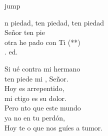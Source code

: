 \begin{cancion}jump\\
	\begin{chorus}%
		n piedad, ten piedad, ten piedad\\
		Señor ten pie\\
		otra  he pado con Ti (**)\\
		. ed.\jump\\
	\end{chorus}%
	Si ué contra mi hermano \\
	ten piede mi , Señor.\\
	Hoy es arrepentido, \\
	mi ctigo es su dolor.\\
	Pero nto que este mundo \\
	ya no  en tu perdón,\\
	Hoy te o que nos guíes a tumor.\\
\end{cancion}%
